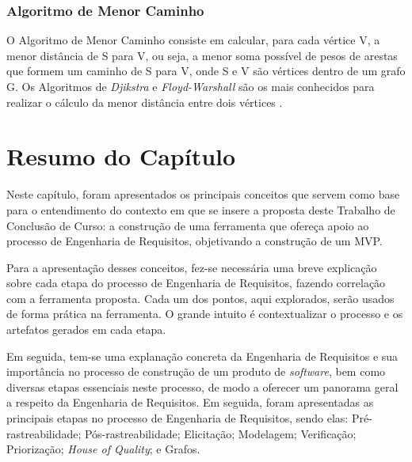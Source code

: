 \subsubsection{Algoritmo de Menor Caminho}

\label{sec:ssp}

O Algoritmo de Menor Caminho consiste em calcular, para cada vértice V, a menor distância de S para V, ou seja, a menor soma possível de pesos de arestas que formem um caminho de S para V, onde S e V são vértices dentro de um grafo G. Os Algoritmos de \textit{Djikstra} e \textit{Floyd-Warshall} são os mais conhecidos para realizar o cálculo da menor distância entre dois vértices \cite{even2011graph}.

\section{Resumo do Capítulo}

\label{sec:resumo_embasamento}

Neste capítulo, foram apresentados os principais conceitos que servem como base para o entendimento do contexto em que se insere a proposta deste Trabalho de Conclusão de Curso: a construção de uma ferramenta que ofereça apoio ao processo de Engenharia de Requisitos, objetivando a construção de um MVP.

Para a apresentação desses conceitos, fez-se necessária uma breve explicação sobre cada etapa do processo de Engenharia de Requisitos, fazendo correlação com a ferramenta proposta. Cada um dos pontos, aqui explorados, serão usados de forma prática na ferramenta. O grande intuito é contextualizar o processo e os artefatos gerados em cada etapa.

Em seguida, tem-se uma explanação concreta da Engenharia de Requisitos e sua importância no processo de construção de um produto de \textit{software}, bem como diversas etapas essenciais neste processo, de modo a oferecer um panorama geral a respeito da Engenharia de Requisitos. Em seguida, foram apresentadas as principais etapas no processo de Engenharia de Requisitos, sendo elas: Pré-rastreabilidade; Pós-rastreabilidade; Elicitação; Modelagem; Verificação; Priorização; \textit{House of Quality}; e Grafos.